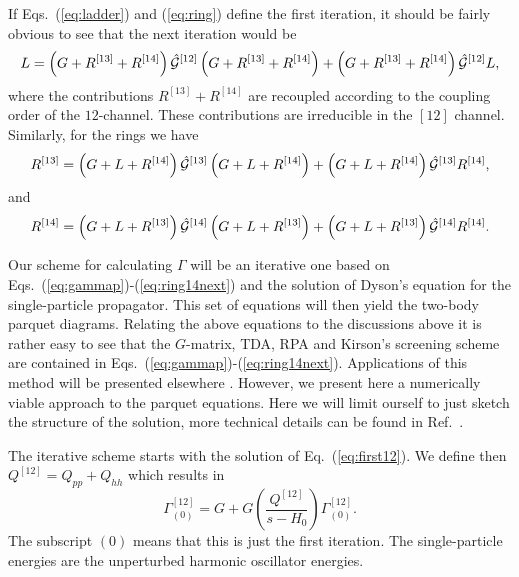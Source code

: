 \documentclass[twoside,12pt]{article}
\begin{document}
If Eqs.\ (\ref{eq:ladder}) and (\ref{eq:ring}) define the first iteration,
it should be fairly obvious to see that the next iteration would be
\begin{equation}
    L=\left(G+R^{[13]}+R^{[14]}\right)\hat{{\cal G}}^{[12]}\left(G+R^{[13]}+R^{[14]}\right)
      +\left(G+R^{[13]}+R^{[14]}\right)\hat{{\cal G}}^{[12]}L,
    \label{eq:laddernext}
\end{equation}
where the contributions $R^{[13]}+R^{[14]} $ are recoupled according to the coupling order
of the $12$-channel. These contributions are irreducible in the $[12]$ channel.
Similarly, for the rings we have
\begin{equation}
    R^{[13]}=\left(G+L+R^{[14]}\right)\hat{{\cal G}}^{[13]}
             \left(G+L+R^{[14]}\right) +
             \left(G+L+R^{[14]}\right)\hat{{\cal G}}^{[13]}R^{[14]},
    \label{eq:ring13next}
\end{equation}
and
\begin{equation}
    R^{[14]}=\left(G+L+R^{[13]}\right)\hat{{\cal G}}^{[14]}
             \left(G+L+R^{[13]}\right) +
             \left(G+L+R^{[13]}\right)\hat{{\cal G}}^{[14]}R^{[14]}.
    \label{eq:ring14next}
\end{equation}


Our scheme for calculating $\Gamma$ will be an iterative one based on
Eqs.\ (\ref{eq:gammap})-(\ref{eq:ring14next})
and the solution of Dyson's equation
for the single-particle propagator. This set of equations will then yield
the two-body parquet diagrams.
Relating the above equations to the discussions above it is rather easy to see
that the $G$-matrix, TDA, RPA and Kirson's
screening scheme are contained in Eqs.\
(\ref{eq:gammap})-(\ref{eq:ring14next}).
Applications of this method will be presented elsewhere \cite{mhj99}. However, we present
here a numerically viable approach
to the parquet equations.
Here
we will limit ourself to just sketch 
the structure of the solution, more technical details 
can be found in Ref.~\cite{mhj99}.

The iterative scheme starts with the solution of Eq.\ (\ref{eq:first12}).
We define then $Q^{[12]}=Q_{pp}+Q_{hh}$ which results in 
\begin{equation}
   \Gamma^{[12]}_{(0)}=G+G\left(\frac{Q^{[12]}}{s-H_0}\right)\Gamma^{[12]}_{(0)}.
   \label{eq:approx12channel}
\end{equation}
The subscript $(0)$ means that this is just the first iteration.
The single-particle energies are the unperturbed
harmonic oscillator energies.  
\end{document}
